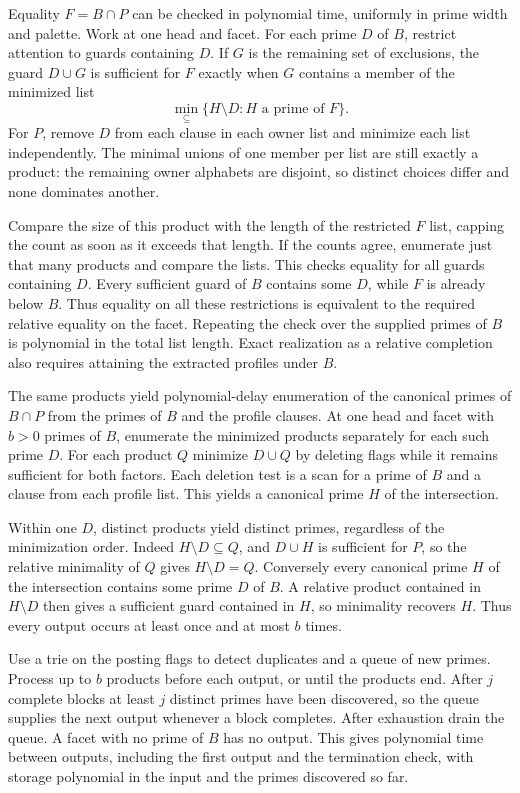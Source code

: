 Equality $F=B\cap P$ can be checked in polynomial
time, uniformly in prime width and palette. Work
at one head and facet. For each prime $D$ of $B$,
restrict attention to guards containing $D$. If $G$
is the remaining set of exclusions, the guard $D\cup G$
is sufficient for $F$ exactly when $G$ contains a
member of the minimized list
\[
                   \min_{\subseteq}\{H\setminus D:H\text{ a prime of }F\}.
\]
For $P$, remove $D$ from each clause in each owner
list and minimize each list independently. The
minimal unions of one member per list are still
exactly a product: the remaining owner alphabets
are disjoint, so distinct choices differ and none
dominates another.

Compare the size of this product with the length
of the restricted $F$ list, capping the count as
soon as it exceeds that length. If the counts
agree, enumerate just that many products and
compare the lists. This checks equality for all
guards containing $D$. Every sufficient guard of
$B$ contains some $D$, while $F$ is already below
$B$. Thus equality on all these restrictions is
equivalent to the required relative equality on
the facet. Repeating the check over the supplied
primes of $B$ is polynomial in the total list
length. Exact realization as a relative completion
also requires attaining the extracted profiles under
$B$.

The same products yield polynomial-delay enumeration
of the canonical primes of $B\cap P$ from the primes
of $B$ and the profile clauses. At one head and facet
with $b>0$ primes of $B$, enumerate the minimized
products separately for each such prime $D$. For each
product $Q$ minimize $D\cup Q$ by deleting flags
while it remains sufficient for both factors. Each
deletion test is a scan for a prime of $B$ and a
clause from each profile list. This yields a canonical
prime $H$ of the intersection.

Within one $D$, distinct products yield distinct
primes, regardless of the minimization order.
Indeed $H\setminus D\subseteq Q$, and $D\cup H$ is
sufficient for $P$, so the relative minimality of
$Q$ gives $H\setminus D=Q$. Conversely every canonical
prime $H$ of the intersection contains some prime $D$
of $B$. A relative product contained in $H\setminus D$
then gives a sufficient guard contained in $H$,
so minimality recovers $H$. Thus every output occurs
at least once and at most $b$ times.

Use a trie on the posting flags to detect duplicates
and a queue of new primes. Process up to $b$ products
before each output, or until the products end. After
$j$ complete blocks at least $j$ distinct primes have
been discovered, so the queue supplies the next
output whenever a block completes. After exhaustion
drain the queue. A facet with no prime of $B$ has
no output. This gives polynomial time between
outputs, including the first output and the
termination check, with storage polynomial in the
input and the primes discovered so far.

